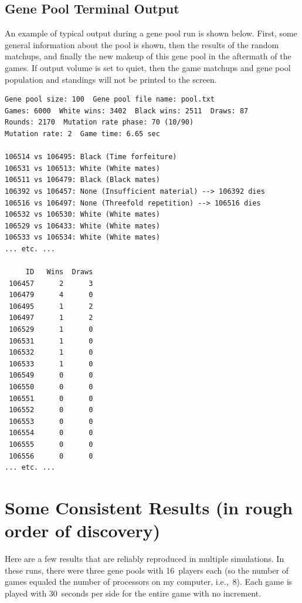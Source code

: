 \documentclass[letterpaper]{article}
\newcommand{\code}[1]{\small\textsf{#1}}
\renewcommand{\_}{\allowbreak\textunderscore\allowbreak}
\begin{document}
\subsection{Gene Pool Terminal Output}
An example of typical output during a gene pool run is shown below. First, some general information about the pool is shown, then the results of the random matchups, and finally the new makeup of this gene pool in the aftermath of the games. If \code{output volume} is set to \code{quiet}, then the game matchups and gene pool population and standings will not be printed to the screen.
\begin{verbatim}
Gene pool size: 100  Gene pool file name: pool.txt
Games: 6000  White wins: 3402  Black wins: 2511  Draws: 87
Rounds: 2170  Mutation rate phase: 70 (10/90)
Mutation rate: 2  Game time: 6.65 sec

106514 vs 106495: Black (Time forfeiture)
106531 vs 106513: White (White mates)
106511 vs 106479: Black (Black mates)
106392 vs 106457: None (Insufficient material) --> 106392 dies
106516 vs 106497: None (Threefold repetition) --> 106516 dies
106532 vs 106530: White (White mates)
106529 vs 106433: White (White mates)
106533 vs 106534: White (White mates)
... etc. ...

     ID   Wins  Draws
 106457      2      3
 106479      4      0
 106495      1      2
 106497      1      2
 106529      1      0
 106531      1      0
 106532      1      0
 106533      1      0
 106549      0      0
 106550      0      0
 106551      0      0
 106552      0      0
 106553      0      0
 106554      0      0
 106555      0      0
 106556      0      0
... etc. ...
\end{verbatim}


\section{Some Consistent Results (in rough order of discovery)}

Here are a few results that are reliably reproduced in multiple simulations. In these runs, there were three gene pools with 16~players each (so the number of games equaled the number of processors on my computer, i.e.,~8). Each game is played with 30~seconds per side for the entire game with no increment.
\end{document}

